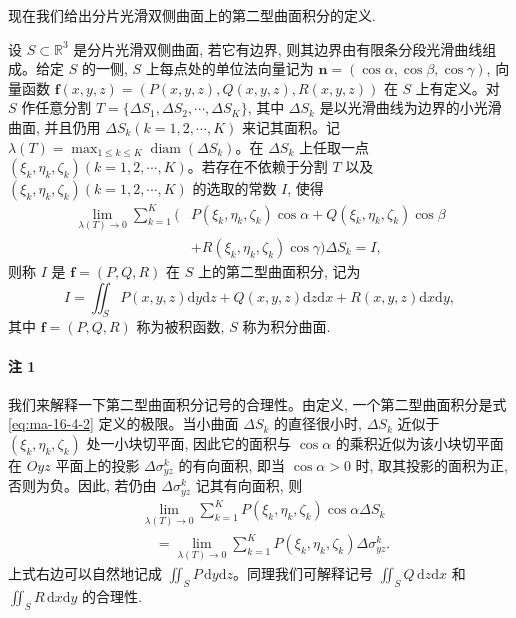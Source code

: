 现在我们给出分片光滑双侧曲面上的第二型曲面积分的定义.

\begin{definition}\label{definition:ma-16-4-2}
设 $S\subset\mathbb R^3$ 是分片光滑双侧曲面, 若它有边界, 则其边界由有限条分段光滑曲线组成。给定 $S$ 的一侧, $S$ 上每点处的单位法向量记为 $\boldsymbol n=(\cos\alpha,\cos\beta,\cos\gamma)$, 向量函数 $\boldsymbol f(x,y,z)=(P(x,y,z),Q(x,y,z),R(x,y,z))$ 在 $S$ 上有定义。对 $S$ 作任意分割 $T=\{\Delta S_1,\Delta S_2,\cdots,\Delta S_K\}$, 其中 $\Delta S_k$ 是以光滑曲线为边界的小光滑曲面, 并且仍用 $\Delta S_k(k=1,2,\cdots,K)$ 来记其面积。记 $\lambda(T)=\max_{1\leqslant k\leqslant K}\operatorname{diam}(\Delta S_k)$。在 $\Delta S_k$ 上任取一点 $(\xi_k,\eta_k,\zeta_k)(k=1,2,\cdots,K)$。若存在不依赖于分割 $T$ 以及 $(\xi_k,\eta_k,\zeta_k)(k=1,2,\cdots,K)$ 的选取的常数 $I$, 使得
\begin{equation}
\begin{aligned}
  \lim_{\lambda(T)\to0}\sum_{k=1}^K
  (&P(\xi_k,\eta_k,\zeta_k)\cos\alpha
  +Q(\xi_k,\eta_k,\zeta_k)\cos\beta\\
  &+R(\xi_k,\eta_k,\zeta_k)\cos\gamma)\Delta S_k=I,
\end{aligned}
\label{eq:ma-16-4-2}
\end{equation}
则称 $I$ 是 $\boldsymbol f=(P,Q,R)$ 在 $S$ 上的第二型曲面积分, 记为
\[
  I=\iint_S P(x,y,z)\mathrm dy\mathrm dz
    +Q(x,y,z)\mathrm dz\mathrm dx
    +R(x,y,z)\mathrm dx\mathrm dy,
\]
其中 $\boldsymbol f=(P,Q,R)$ 称为被积函数, $S$ 称为积分曲面.
\end{definition}


\paragraph*{注 1}
我们来解释一下第二型曲面积分记号的合理性。由定义, 一个第二型曲面积分是式 \eqref{eq:ma-16-4-2} 定义的极限。当小曲面 $\Delta S_k$ 的直径很小时, $\Delta S_k$ 近似于 $(\xi_k,\eta_k,\zeta_k)$ 处一小块切平面, 因此它的面积与 $\cos\alpha$ 的乘积近似为该小块切平面在 $Oyz$ 平面上的投影 $\Delta\sigma^k_{yz}$ 的有向面积, 即当 $\cos\alpha>0$ 时, 取其投影的面积为正, 否则为负。因此, 若仍由 $\Delta\sigma^k_{yz}$ 记其有向面积, 则
\[
\begin{aligned}
  &\lim_{\lambda(T)\to0}\sum_{k=1}^K
    P(\xi_k,\eta_k,\zeta_k)\cos\alpha\Delta S_k\\
  &\quad=\lim_{\lambda(T)\to0}\sum_{k=1}^K
    P(\xi_k,\eta_k,\zeta_k)\Delta\sigma^k_{yz}.
\end{aligned}
\]
上式右边可以自然地记成 $\iint_S P\,\mathrm dy\mathrm dz$。同理我们可解释记号 $\iint_S Q\,\mathrm dz\mathrm dx$ 和 $\iint_S R\,\mathrm dx\mathrm dy$ 的合理性.

